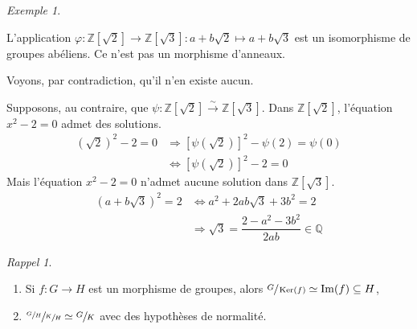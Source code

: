 \documentclass{report}
\theoremstyle{definition}
\theoremstyle{remark}
\newtheorem*{exem}{Exemple}
\newtheorem*{rapp}{Rappel}
\def\ZZ{\mathbb{Z}}
\def\QQ{\mathbb{Q}}
\def\im{\operatorname{Im}}
\def\noyau{\operatorname{Ker}}
\begin{document}
\begin{exem}
\begin{enumerate}
			L'application $\varphi : \ZZ[\sqrt{2}]\to\ZZ[\sqrt{3}] : a+b\sqrt{2} \mapsto a+b\sqrt{3}$ est un isomorphisme de groupes ab\'eliens. Ce n'est pas un morphisme d'anneaux.

			Voyons, par contradiction, qu'il n'en existe aucun.

			Supposons, au contraire, que $\psi : \ZZ[\sqrt{2}] \xrightarrow{\sim} \ZZ[\sqrt{3}]$. Dans $\ZZ[\sqrt{2}]$, l'\'equation $x^2-2=0$ admet des solutions.
			\begin{align*}
				\left(\sqrt{2}\right)^2-2=0&\Rightarrow \left[\psi(\sqrt{2})\right]^2-\psi(2)=\psi(0)\\
				&\Leftrightarrow \left[\psi(\sqrt{2})\right]^2-2=0
			\end{align*}
			Mais l'\'equation $x^2-2=0$ n'admet aucune solution dans $\ZZ[\sqrt{3}]$.
			\begin{align*}
				(a+b\sqrt{3})^2=2&\Leftrightarrow a^2+2ab\sqrt{3}+3b^2=2\\
				&\Rightarrow \sqrt{3}=\dfrac{2-a^2-3b^2}{2ab} \in \QQ
			\end{align*}
		\end{enumerate}
	\end{exem}

	\begin{rapp}
		\begin{enumerate}
			\item Si $f:G\to H$ est un morphisme de groupes, alors $\sfrac{G}{\noyau(f)} \simeq \im(f) \subseteq H$,
			\item $\sfrac{\sfrac{G}{H}}{\sfrac{K}{H}} \simeq \sfrac{G}{K}$ avec des hypoth\`eses de normalit\'e.
		\end{enumerate}
	\end{rapp}
\end{document}
